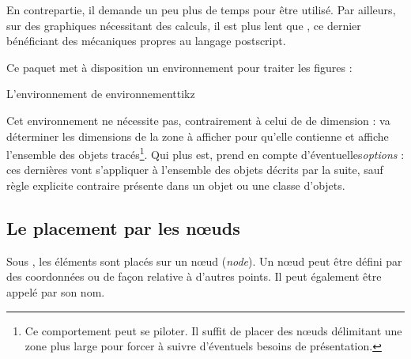 En contrepartie, il demande un peu plus de temps pour être utilisé. Par ailleurs, sur des graphiques nécessitant des calculs, il est plus lent que , ce dernier bénéficiant des mécaniques propres au langage postscript.

Ce paquet met à disposition un environnement pour traiter les figures : 
\begin{codesimple}{L'environnement de }{environnementtikz}
\begin{tikzpicture}[§oc£¤options§fc] 
\end{tikzpicture}
\end{codesimple}


Cet environnement ne nécessite pas, contrairement à celui de  de dimension :  va déterminer les dimensions de la zone à afficher pour qu'elle contienne et affiche l'ensemble des objets tracés\footnote{Ce comportement peut se piloter. Il suffit de placer des n\oe{}uds délimitant une zone plus large pour forcer  à suivre d'éventuels besoins de présentation.}. Qui plus est,  prend en compte d'éventuelles\textit{options} : ces dernières vont s'appliquer à l'ensemble des objets décrits par la suite, sauf règle explicite contraire présente dans un objet ou une classe d'objets.

\subsection{Le placement par les n\oe{}uds}

Sous , les éléments sont placés sur un n\oe ud (\emph{node}). Un n\oe ud peut être défini par des coordonnées ou de façon relative à d'autres points. Il peut également être appelé par son nom.

